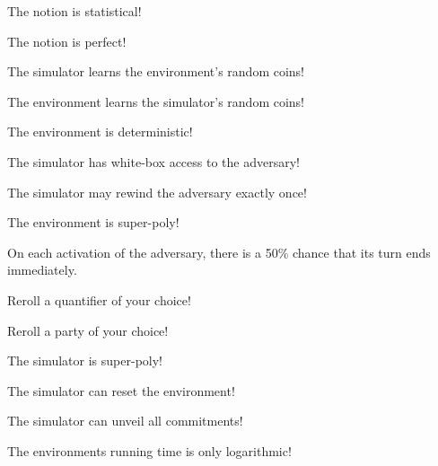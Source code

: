 \documentclass[avery5371,frame,grid]{flashcards}
\begin{document}
\begin{flashcard}{\ucftw}
  The notion is statistical!
\end{flashcard}
\begin{flashcard}{\ucftw}
  The notion is perfect!
\end{flashcard}
\begin{flashcard}{\ucftw}
  The simulator learns the environment's random coins!
\end{flashcard}
\begin{flashcard}{\ucftw}
  The environment learns the simulator's random coins!
\end{flashcard}
\begin{flashcard}{\ucftw}
  The environment is deterministic!
\end{flashcard}
\begin{flashcard}{\ucftw}
  The simulator has white-box access to the adversary!
\end{flashcard}
\begin{flashcard}{\ucftw}
  The simulator may rewind the adversary exactly once!
\end{flashcard}
\begin{flashcard}{\ucftw}
  The environment is super-poly!
\end{flashcard}
\begin{flashcard}{\ucftw}
  On each activation of the adversary, there is a 50\% chance that its turn ends immediately. 
\end{flashcard}
\begin{flashcard}{\ucftw}
  Reroll a quantifier of your choice!
\end{flashcard}
\begin{flashcard}{\ucftw}
  Reroll a party of your choice!
\end{flashcard}
\begin{flashcard}{\ucftw}
  The simulator is super-poly!
\end{flashcard}
\begin{flashcard}{\ucftw}
  The simulator can reset the environment!
\end{flashcard}
\begin{flashcard}{\ucftw}
  The simulator can unveil all commitments!
\end{flashcard}
\begin{flashcard}{\ucftw}
  The environments running time is only logarithmic!
\end{flashcard}

\end{document}
